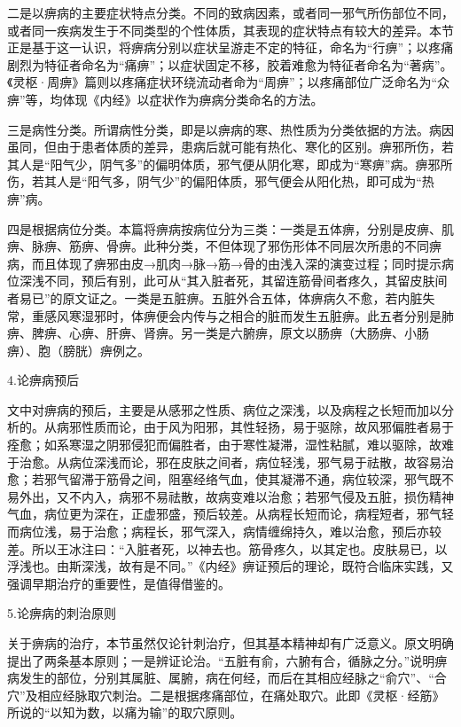\documentclass[draft,12pt]{ctexbook}
\begin{document}
二是以痹病的主要症状特点分类。不同的致病因素，或者同一邪气所伤部位不同，或者同一疾病发生于不同类型的个性体质，其表现的症状特点有较大的差异。本节正是基于这一认识，将痹病分别以症状呈游走不定的特征，命名为“行痹”；以疼痛剧烈为特征者命名为“痛痹”；以症状固定不移，胶着难愈为特征者命名为“著病”。《灵枢·周痹》篇则以疼痛症状环绕流动者命为“周痹”；以疼痛部位广泛命名为“众痹”等，均体现《内经》以症状作为痹病分类命名的方法。

三是病性分类。所谓病性分类，即是以痹病的寒、热性质为分类依据的方法。病因虽同，但由于患者体质的差异，患病后就可能有热化、寒化的区别。痹邪所伤，若其人是“阳气少，阴气多”的偏明体质，邪气便从阴化寒，即成为“寒痹”病。痹邪所伤，若其人是“阳气多，阴气少”的偏阳体质，邪气便会从阳化热，即可成为“热痹”病。

四是根据病位分类。本篇将痹病按病位分为三类：一类是五体痹，分别是皮痹、肌痹、脉痹、筋痹、骨痹。此种分类，不但体现了邪伤形体不同层次所患的不同痹病，而且体现了痹邪由皮→肌肉→脉→筋→骨的由浅入深的演变过程；同时提示病位深浅不同，预后有别，此可从“其入脏者死，其留连筋骨间者疼久，其留皮肤间者易已”的原文证之。一类是五脏痹。五脏外合五体，体痹病久不愈，若内脏失常，重感风寒湿邪时，体痹便会内传与之相合的脏而发生五脏痹。此五者分别是肺痹、脾痹、心痹、肝痹、肾痹。另一类是六腑痹，原文以肠痹（大肠痹、小肠痹）、胞（膀胱）痹例之。

4.论痹病预后

文中对痹病的预后，主要是从感邪之性质、病位之深浅，以及病程之长短而加以分析的。从病邪性质而论，由于风为阳邪，其性轻扬，易于驱除，故风邪偏胜者易于痊愈；如系寒湿之阴邪侵犯而偏胜者，由于寒性凝滞，湿性粘腻，难以驱除，故难于治愈。从病位深浅而论，邪在皮肤之间者，病位轻浅，邪气易于祛散，故容易治愈；若邪气留滞于筋骨之间，阻塞经络气血，使其凝滞不通，病位较深，邪气既不易外出，又不内入，病邪不易祛散，故病变难以治愈；若邪气侵及五脏，损伤精神气血，病位更为深在，正虚邪盛，预后较差。从病程长短而论，病程短者，邪气轻而病位浅，易于治愈；病程长，邪气深入，病情缠绵持久，难以治愈，预后亦较差。所以王冰注曰：“入脏者死，以神去也。筋骨疼久，以其定也。皮肤易已，以浮浅也。由斯深浅，故有是不同。”《内经》痹证预后的理论，既符合临床实践，又强调早期治疗的重要性，是值得借鉴的。

5.论痹病的刺治原则

关于痹病的治疗，本节虽然仅论针刺治疗，但其基本精神却有广泛意义。原文明确提出了两条基本原则；一是辨证论治。“五脏有俞，六腑有合，循脉之分。”说明痹病发生的部位，分别其属脏、属腑，病在何经，而后在其相应经脉之“俞穴”、“合穴”及相应经脉取穴刺治。二是根据疼痛部位，在痛处取穴。此即《灵枢·经筋》所说的“以知为数，以痛为输”的取穴原则。
\end{document}
